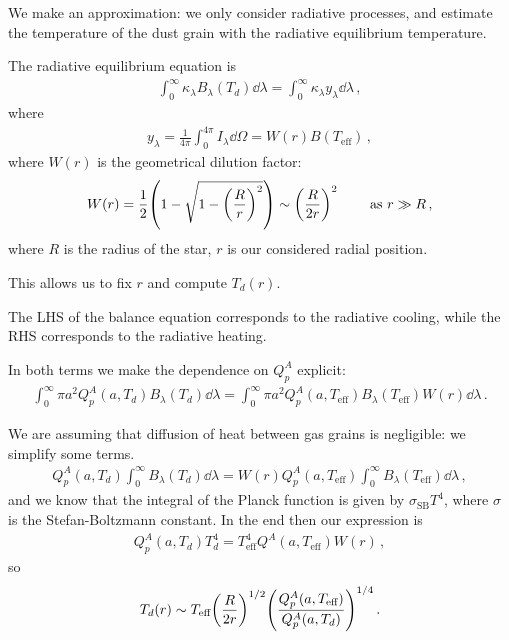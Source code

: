 \documentclass[main.tex]{subfiles}
\begin{document}
We make an approximation: we only consider radiative processes, and estimate the temperature of the dust grain with the radiative equilibrium temperature. 

The radiative equilibrium equation is 
%
\begin{align}
  \int_{0}^{ \infty } \kappa_{\lambda } B_{\lambda }(T_d) \dd{\lambda }
  = \int_{0}^{ \infty } \kappa_{\lambda } y_{\lambda } \dd{\lambda }
\,,
\end{align}
%
where 
%
\begin{align}
  y_{\lambda } = \frac{1}{4 \pi } \int_{0}^{4 \pi } I_{\lambda } \dd{\Omega } = W(r) B( T _{\text{eff}})
\,,
\end{align}
%
where \(W(r)\) is the geometrical dilution factor: 
%
\begin{align}
  W(r ) = \frac{1}{2} \qty(1 - \sqrt{1 - \qty(\frac{R}{r})^2}) \sim \qty(\frac{R}{2r})^2
\qquad \text{ as } r \gg R
\,,
\end{align}
%
where \(R\) is the radius of the star, \(r\) is our considered radial position.

This allows us to fix \(r\) and compute \(T_d (r)\). 

The LHS of the balance equation corresponds to the radiative cooling, while the RHS corresponds to the radiative heating. 

In both terms we make the dependence on \(Q_p^{A}\) explicit: 
%
\begin{align}
  \int_{0}^{ \infty } \pi a^2 Q_p^{A} (a, T_d) B_\lambda (T_d) \dd{\lambda } =
  \int_{0}^{ \infty } \pi a^2 Q_p^{A} (a, T _{\text{eff}}) B_\lambda (T _{\text{eff}}) W(r) \dd{\lambda }
\,.
\end{align}

We are assuming that diffusion of heat between gas grains is negligible: we simplify some terms. 
%
\begin{align}
  Q_p^{A} (a, T_d ) \int_{0}^{ \infty } B_\lambda(T_d) \dd{\lambda }
  = W(r) Q_p^{A} (a, T _{\text{eff}}) \int_{0}^{ \infty }
  B_\lambda (T _{\text{eff}}) \dd{\lambda }
\,,
\end{align}
%
and we know that the integral of the Planck function is given by \(\sigma _{\text{SB}} T^{4}\), where \(\sigma \) is the Stefan-Boltzmann constant. In the end then our expression is 
%
\begin{align}
  Q_p^{A} (a, T_d) T_d^{4} = T^{4} _{\text{eff}} Q^{A}(a, T _{\text{eff}}) W(r)
\,,
\end{align}
%
so 
%
\begin{align}
  T_d(r) \sim T _{\text{eff}} \qty(\frac{R}{2r})^{1/2} \qty(\frac{Q^{A}_{p} (a, T _{\text{eff}})}{Q^{A}_{p} (a,T_{d})})^{1/4}
\,.
\end{align}
\end{document}
